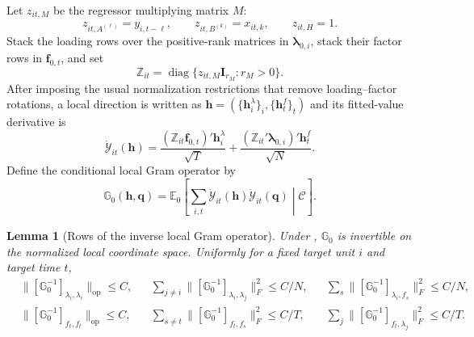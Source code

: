 \documentclass[11pt]{article}
\numberwithin{equation}{section}
\newtheorem{lemma}{Lemma}
\theoremstyle{remark}
\newcommand{\Ezero}{\mathbb E_0}
\newcommand{\op}{\operatorname{op}}
\begin{document}
Let $z_{it,M}$ be the regressor multiplying matrix $M$:
$$
z_{it,A^{(\ell)}}=y_{i,t-\ell},
\qquad
z_{it,B^{(k)}}=x_{it,k},
\qquad
z_{it,H}=1.
$$
Stack the loading rows over the positive-rank matrices in $\bm\lambda_{0,i}$, stack their factor rows in $\bm f_{0,t}$, and set
$$
\mathbb Z_{it}
=
\operatorname{diag}\{z_{it,M}\bm I_{r_M}:r_M>0\}.
$$
After imposing the usual normalization restrictions that remove loading--factor rotations, a local direction is written as $\bm h=(\{\bm h_i^\lambda\}_i,\{\bm h_t^f\}_t)$ and its fitted-value derivative is
\begin{equation}
\label{eq:local_derivative}
\dot{\mathcal Y}_{it}(\bm h)
=
\frac{(\mathbb Z_{it}\bm f_{0,t})'\bm h_i^\lambda}{\sqrt T}
+
\frac{(\mathbb Z_{it}'\bm\lambda_{0,i})'\bm h_t^f}{\sqrt N}.
\end{equation}
Define the conditional local Gram operator by
$$
\mathbb G_0(\bm h,\bm q)
=
\Ezero\!\left[
\sum_{i,t}
\dot{\mathcal Y}_{it}(\bm h)
\dot{\mathcal Y}_{it}(\bm q)
\middle|\mathscr C
\right].
$$

\begin{lemma}[Rows of the inverse local Gram operator]
\label{lem:inverse_gram_rows}
Under , $\mathbb G_0$ is invertible on the normalized local coordinate space. Uniformly for a fixed target unit $i$ and target time $t$,
\begin{equation}
\label{eq:inverse_gram_rows}
\begin{aligned}
&\|[\mathbb G_0^{-1}]_{\lambda_i,\lambda_i}\|_{\op}\le C,
&&\sum_{j\ne i}\|[\mathbb G_0^{-1}]_{\lambda_i,\lambda_j}\|_F^2\le C/N,
&&\sum_s\|[\mathbb G_0^{-1}]_{\lambda_i,f_s}\|_F^2\le C/N,\\
&\|[\mathbb G_0^{-1}]_{f_t,f_t}\|_{\op}\le C,
&&\sum_{s\ne t}\|[\mathbb G_0^{-1}]_{f_t,f_s}\|_F^2\le C/T,
&&\sum_j\|[\mathbb G_0^{-1}]_{f_t,\lambda_j}\|_F^2\le C/T.
\end{aligned}
\end{equation}
\end{lemma}
\end{document}
